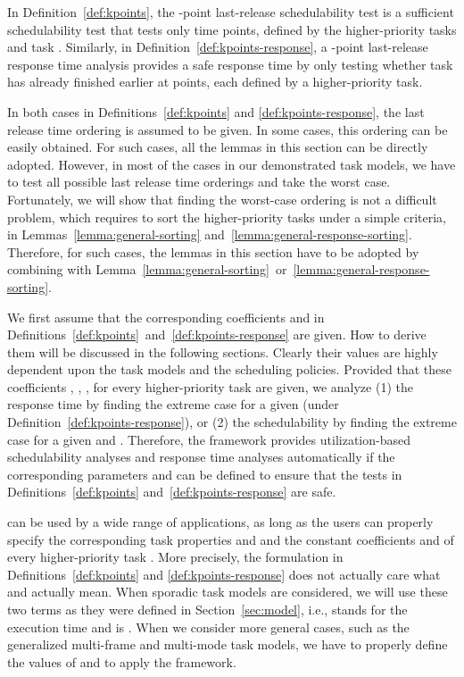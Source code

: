 \documentclass[10pt,conference]{IEEEtran}
\newcommand{\frameworkkq}[1]{}
\begin{document}
In Definition~\ref{def:kpoints}, the -point last-release
schedulability test is a sufficient schedulability test that tests
only  time points, defined by the  higher-priority tasks and
task . 
Similarly,  in Definition~\ref{def:kpoints-response}, a -point
last-release response time analysis provides a safe response time
by only testing whether task  has already finished earlier at
 points, each defined by a higher-priority task. 


In both cases in Definitions~\ref{def:kpoints} and
\ref{def:kpoints-response}, the last release time ordering  is
assumed to be given. In some cases, this ordering can be easily
obtained. For such cases, all the lemmas in this section can be directly adopted.
However, in most of the cases in our demonstrated task
models, we have to test all possible last release time orderings and
take the worst case. Fortunately, we will show that finding the
worst-case ordering is not a difficult problem, which requires to sort
the  higher-priority tasks under a simple criteria, in Lemmas~\ref{lemma:general-sorting} and~\ref{lemma:general-response-sorting}. 
Therefore, for such cases, the lemmas in this section have to be adopted by combining with Lemma~\ref{lemma:general-sorting}~or~\ref{lemma:general-response-sorting}.


We first assume that the corresponding coefficients  and
 in
Definitions~\ref{def:kpoints}~and~\ref{def:kpoints-response} are
given. How to derive them will be discussed in the following sections.
Clearly their values are highly dependent upon the task models and the
scheduling policies.  Provided that these coefficients ,
, ,  for every higher-priority task  are given, we analyze (1) the response time by finding the
extreme case for a given  (under
Definition~\ref{def:kpoints-response}), or (2) the schedulability by
finding the extreme case for a given  and . Therefore, the
\frameworkkq{} framework provides utilization-based schedulability
analyses and response time analyses automatically if the
corresponding parameters  and  can be defined to
ensure that the tests in Definitions~\ref{def:kpoints}
and~\ref{def:kpoints-response} are safe.

\frameworkkq{} can be used by a wide range of applications, as long
as the users can properly specify the corresponding task properties
 and  and the constant coefficients  and 
of every higher-priority task . More precisely, the formulation in
Definitions~\ref{def:kpoints} and \ref{def:kpoints-response} does not
actually care what  and  actually mean. When sporadic
task models are considered, we will use these two terms as they were
defined in Section~\ref{sec:model}, i.e.,  stands for the
execution time and   is . When we consider more
general cases, such as the generalized multi-frame and multi-mode task
models, we have to properly define the values of  and  to
apply the framework.
\end{document}
